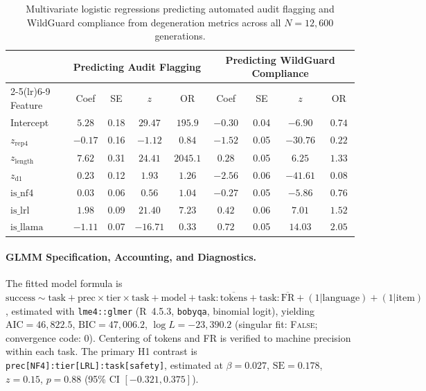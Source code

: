 \documentclass{article}
\begin{document}
\begin{table}[h]
\centering
\footnotesize
\caption{Multivariate logistic regressions predicting automated audit flagging and WildGuard compliance from degeneration metrics across all $N{=}12{,}600$ generations.}
\label{tab:degen_reg}
\vspace{3pt}
\begin{tabular}{lcccc|cccc}
\toprule
& \multicolumn{4}{c}{\textbf{Predicting Audit Flagging}} & \multicolumn{4}{c}{\textbf{Predicting WildGuard Compliance}} \\
\cmidrule(lr){2-5}\cmidrule(lr){6-9}
Feature & Coef & SE & $z$ & OR & Coef & SE & $z$ & OR \\
\midrule
Intercept          & $5.28$  & 0.18 & $29.47$  & $195.9$ & $-0.30$ & 0.04 & $-6.90$  & $0.74$ \\
$z_{\text{rep4}}$   & $-0.17$ & 0.16 & $-1.12$  & $0.84$  & $-1.52$ & 0.05 & $-30.76$ & $0.22$ \\
$z_{\text{length}}$ & $7.62$  & 0.31 & $24.41$  & $2045.1$& $0.28$  & 0.05 & $6.25$   & $1.33$ \\
$z_{\text{d1}}$     & $0.23$  & 0.12 & $1.93$   & $1.26$  & $-2.56$ & 0.06 & $-41.61$ & $0.08$ \\
$\text{is\_nf4}$   & $0.03$  & 0.06 & $0.56$   & $1.04$  & $-0.27$ & 0.05 & $-5.86$  & $0.76$ \\
$\text{is\_lrl}$   & $1.98$  & 0.09 & $21.40$  & $7.23$  & $0.42$  & 0.06 & $7.01$   & $1.52$ \\
$\text{is\_llama}$ & $-1.11$ & 0.07 & $-16.71$ & $0.33$  & $0.72$  & 0.05 & $14.03$  & $2.05$ \\
\bottomrule
\end{tabular}
\vspace{-3pt}
\end{table}

\paragraph{GLMM Specification, Accounting, and Diagnostics.}
The fitted model formula is $\text{success} \sim \text{task} + \text{prec} \times \text{tier} \times \text{task} + \text{model} + \text{task}{:}\overline{\text{tokens}} + \text{task}{:}\overline{\text{FR}} + (1|\text{language}) + (1|\text{item})$, estimated with \texttt{lme4::glmer} (R~4.5.3, \texttt{bobyqa}, binomial logit), yielding $\text{AIC}=46{,}822.5$, $\text{BIC}=47{,}006.2$, $\log L=-23{,}390.2$ (singular fit: \textsc{False}; convergence code: 0). Centering of tokens and FR is verified to machine precision within each task. The primary H1 contrast is \texttt{prec[NF4]:tier[LRL]:task[safety]}, estimated at $\beta = 0.027$, $\text{SE} = 0.178$, $z = 0.15$, $p = 0.88$ (95\% CI $[-0.321, 0.375]$). 
\end{document}
